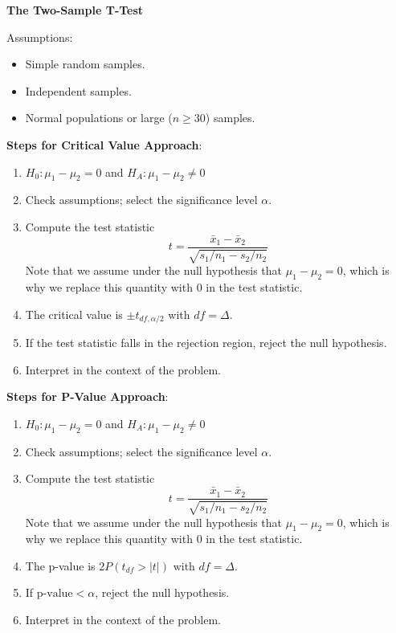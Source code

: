 \documentclass[
]{book}
\providecommand{\tightlist}{%
  \setlength{\itemsep}{0pt}\setlength{\parskip}{0pt}}
\begin{document}
\textbf{The Two-Sample T-Test}

Assumptions:

\begin{itemize}
\tightlist
\item
  Simple random samples.
\item
  Independent samples.
\item
  Normal populations or large (\(n \ge 30\)) samples.
\end{itemize}

\textbf{Steps for Critical Value Approach}:

\begin{enumerate}
\def\labelenumi{\arabic{enumi}.}
\tightlist
\item
  \(H_0: \mu_1 - \mu_2 = 0\) and \(H_A: \mu_1 - \mu_2 \ne 0\)
\item
  Check assumptions; select the significance level \(\alpha\).
\item
  Compute the test statistic \[t = \frac{\bar{x}_1 - \bar{x}_2}{\sqrt{s_1/n_1 - s_2/n_2}}\] Note that we assume under the null hypothesis that \(\mu_1 - \mu_2 = 0\), which is why we replace this quantity with \(0\) in the test statistic.
\item
  The critical value is \(\pm t_{df, \alpha/2}\) with \(df = \Delta\).
\item
  If the test statistic falls in the rejection region, reject the null hypothesis.
\item
  Interpret in the context of the problem.
\end{enumerate}

\textbf{Steps for P-Value Approach}:

\begin{enumerate}
\def\labelenumi{\arabic{enumi}.}
\tightlist
\item
  \(H_0: \mu_1 - \mu_2 = 0\) and \(H_A: \mu_1 - \mu_2 \ne 0\)
\item
  Check assumptions; select the significance level \(\alpha\).
\item
  Compute the test statistic \[t = \frac{\bar{x}_1 - \bar{x}_2}{\sqrt{s_1/n_1 - s_2/n_2}}\] Note that we assume under the null hypothesis that \(\mu_1 - \mu_2 = 0\), which is why we replace this quantity with \(0\) in the test statistic.
\item
  The p-value is \(2P(t_{df} > |t|)\) with \(df = \Delta\).
\item
  If \(\text{p-value}<\alpha\), reject the null hypothesis.
\item
  Interpret in the context of the problem.
\end{enumerate}
\end{document}
